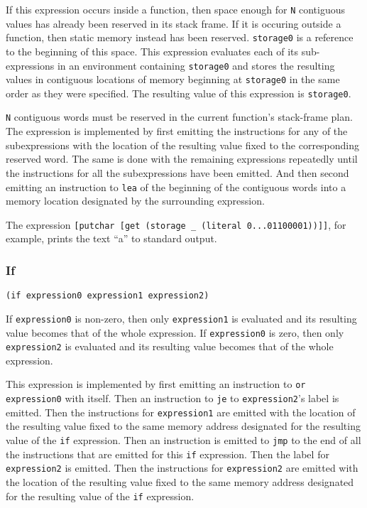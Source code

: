 \documentclass[]{article}
\begin{document}
If this expression occurs inside a function, then space enough for
\texttt{N} contiguous values has already been reserved in its stack
frame. If it is occuring outside a function, then static memory instead
has been reserved. \texttt{storage0} is a reference to the beginning of
this space. This expression evaluates each of its sub-expressions in an
environment containing \texttt{storage0} and stores the resulting values
in contiguous locations of memory beginning at \texttt{storage0} in the
same order as they were specified. The resulting value of this
expression is \texttt{storage0}.

\texttt{N} contiguous words must be reserved in the current function's
stack-frame plan. The expression is implemented by first emitting the
instructions for any of the subexpressions with the location of the
resulting value fixed to the corresponding reserved word. The same is
done with the remaining expressions repeatedly until the instructions
for all the subexpressions have been emitted. And then second emitting
an instruction to \texttt{lea} of the beginning of the contiguous words
into a memory location designated by the surrounding expression.

The expression
\texttt{{[}putchar\ {[}get\ (storage\ \_\ (literal\ 0...01100001)){]}{]}},
for example, prints the text ``a'' to standard output.

\hypertarget{if}{\subsubsection{If}\label{if}}

\begin{verbatim}
(if expression0 expression1 expression2)
\end{verbatim}

If \texttt{expression0} is non-zero, then only \texttt{expression1} is
evaluated and its resulting value becomes that of the whole expression.
If \texttt{expression0} is zero, then only \texttt{expression2} is
evaluated and its resulting value becomes that of the whole expression.

This expression is implemented by first emitting an instruction to
\texttt{or} \texttt{expression0} with itself. Then an instruction to
\texttt{je} to \texttt{expression2}'s label is emitted. Then the
instructions for \texttt{expression1} are emitted with the location of
the resulting value fixed to the same memory address designated for the
resulting value of the \texttt{if} expression. Then an instruction is
emitted to \texttt{jmp} to the end of all the instructions that are
emitted for this \texttt{if} expression. Then the label for
\texttt{expression2} is emitted. Then the instructions for
\texttt{expression2} are emitted with the location of the resulting
value fixed to the same memory address designated for the resulting
value of the \texttt{if} expression.
\end{document}
